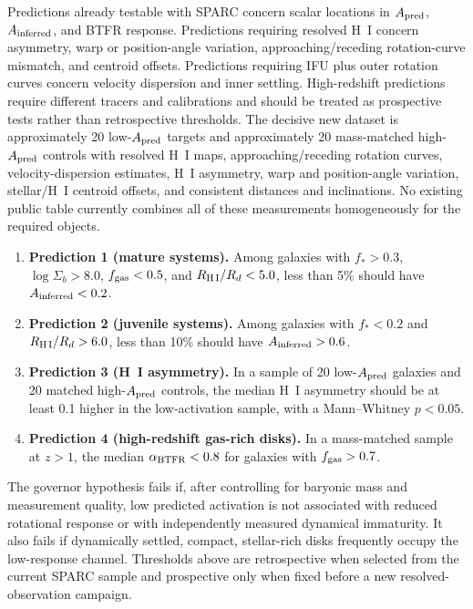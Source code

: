 \documentclass[11pt]{article}
\begin{document}
Predictions already testable with SPARC concern scalar locations in $A_{\rm pred}$, $A_{\rm inferred}$, and BTFR response. Predictions requiring resolved H~I concern asymmetry, warp or position-angle variation, approaching/receding rotation-curve mismatch, and centroid offsets. Predictions requiring IFU plus outer rotation curves concern velocity dispersion and inner settling. High-redshift predictions require different tracers and calibrations and should be treated as prospective tests rather than retrospective thresholds. The decisive new dataset is approximately 20 low-$A_{\rm pred}$ targets and approximately 20 mass-matched high-$A_{\rm pred}$ controls with resolved H~I maps, approaching/receding rotation curves, velocity-dispersion estimates, H~I asymmetry, warp and position-angle variation, stellar/H~I centroid offsets, and consistent distances and inclinations. No existing public table currently combines all of these measurements homogeneously for the required objects.

\begin{enumerate}
\item \textbf{Prediction 1 (mature systems).} Among galaxies with $f_*>0.3$, $\log\Sigma_b>8.0$, $f_{\rm gas}<0.5$, and $R_{\rm H\,I}/R_d<5.0$, less than 5\% should have $A_{\rm inferred}<0.2$.
\item \textbf{Prediction 2 (juvenile systems).} Among galaxies with $f_*<0.2$ and $R_{\rm H\,I}/R_d>6.0$, less than 10\% should have $A_{\rm inferred}>0.6$.
\item \textbf{Prediction 3 (H~I asymmetry).} In a sample of 20 low-$A_{\rm pred}$ galaxies and 20 matched high-$A_{\rm pred}$ controls, the median H~I asymmetry should be at least 0.1 higher in the low-activation sample, with a Mann--Whitney $p<0.05$.
\item \textbf{Prediction 4 (high-redshift gas-rich disks).} In a mass-matched sample at $z>1$, the median $\alpha_{\rm BTFR}<0.8$ for galaxies with $f_{\rm gas}>0.7$.
\end{enumerate}

The governor hypothesis fails if, after controlling for baryonic mass and measurement quality, low predicted activation is not associated with reduced rotational response or with independently measured dynamical immaturity. It also fails if dynamically settled, compact, stellar-rich disks frequently occupy the low-response channel. Thresholds above are retrospective when selected from the current SPARC sample and prospective only when fixed before a new resolved-observation campaign.
\end{document}
